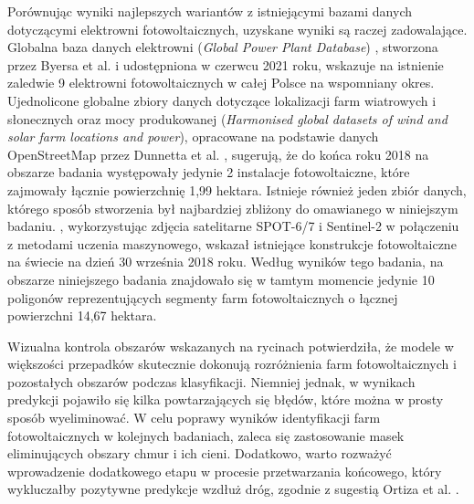 \documentclass{amuthesis}
\begin{document}
Porównując wyniki najlepszych wariantów z istniejącymi bazami danych
dotyczącymi elektrowni fotowoltaicznych, uzyskane wyniki są raczej
zadowalające. Globalna baza danych elektrowni (\emph{Global Power Plant
Database}) \autocite{globalpowerplantdb_2021}, stworzona przez Byersa et
al. \autocite*{byers_2018_globalpowerplantdb} i udostępniona w czerwcu
2021 roku, wskazuje na istnienie zaledwie 9 elektrowni fotowoltaicznych
w całej Polsce na wspomniany okres. Ujednolicone globalne zbiory danych
dotyczące lokalizacji farm wiatrowych i słonecznych oraz mocy
produkowanej (\emph{Harmonised global datasets of wind and solar farm
locations and power}), opracowane na podstawie danych OpenStreetMap
przez Dunnetta et al. \autocite*{dunnet_2020_wind_solar}, sugerują, że
do końca roku 2018 na obszarze badania występowały jedynie 2 instalacje
fotowoltaiczne, które zajmowały łącznie powierzchnię 1,99 hektara.
Istnieje również jeden zbiór danych, którego sposób stworzenia był
najbardziej zbliżony do omawianego w niniejszym badaniu.
\textcite{kruitwagen_2021_pv}, wykorzystując zdjęcia satelitarne
SPOT-6/7 i Sentinel-2 w połączeniu z metodami uczenia maszynowego,
wskazał istniejące konstrukcje fotowoltaiczne na świecie na dzień 30
września 2018 roku. Według wyników tego badania, na obszarze niniejszego
badania znajdowało się w tamtym momencie jedynie 10 poligonów
reprezentujących segmenty farm fotowoltaicznych o łącznej powierzchni
14,67 hektara.

Wizualna kontrola obszarów wskazanych na rycinach potwierdziła, że
modele w większości przepadków skutecznie dokonują rozróżnienia farm
fotowoltaicznych i pozostałych obszarów podczas klasyfikacji. Niemniej
jednak, w wynikach predykcji pojawiło się kilka powtarzających się
błędów, które można w prosty sposób wyeliminować. W celu poprawy wyników
identyfikacji farm fotowoltaicznych w kolejnych badaniach, zaleca się
zastosowanie masek eliminujących obszary chmur i ich cieni. Dodatkowo,
warto rozważyć wprowadzenie dodatkowego etapu w procesie przetwarzania
końcowego, który wykluczałby pozytywne predykcje wzdłuż dróg, zgodnie z
sugestią Ortiza et al. \autocite*{ortiz_2022_pv}.
\end{document}
